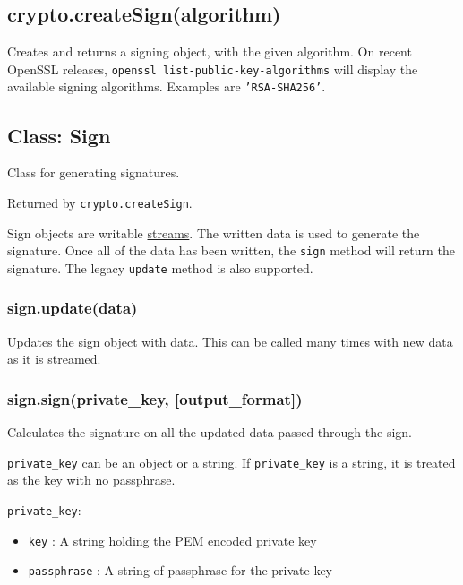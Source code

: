 \subsection{crypto.createSign(algorithm)}\label{crypto.createsignalgorithm}

Creates and returns a signing object, with the given algorithm. On
recent OpenSSL releases, \texttt{openssl list-public-key-algorithms}
will display the available signing algorithms. Examples are
\texttt{'RSA-SHA256'}.

\subsection{Class: Sign}\label{class-sign}

Class for generating signatures.

Returned by \texttt{crypto.createSign}.

Sign objects are writable \href{stream.html}{streams}. The written data
is used to generate the signature. Once all of the data has been
written, the \texttt{sign} method will return the signature. The legacy
\texttt{update} method is also supported.

\subsubsection{sign.update(data)}\label{sign.updatedata}

Updates the sign object with data. This can be called many times with
new data as it is streamed.

\subsubsection{sign.sign(private\_key,
{[}output\_format{]})}\label{sign.signprivateux5fkey-outputux5fformat}

Calculates the signature on all the updated data passed through the
sign.

\texttt{private\_key} can be an object or a string. If
\texttt{private\_key} is a string, it is treated as the key with no
passphrase.

\texttt{private\_key}:

\begin{itemize}
\itemsep1pt\parskip0pt
\item
  \texttt{key} : A string holding the PEM encoded private key
\item
  \texttt{passphrase} : A string of passphrase for the private key
\end{itemize}

